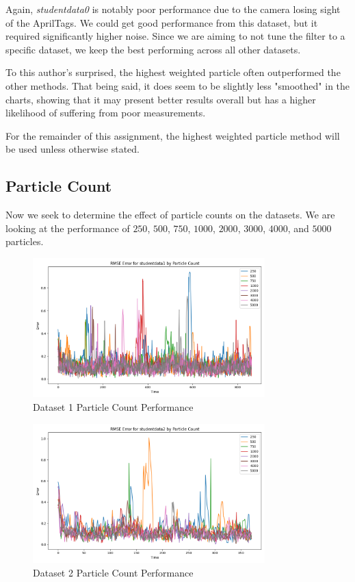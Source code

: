 \documentclass{article}
\begin{document}
Again, \textit{studentdata0} is notably poor performance due to the camera losing sight of the AprilTags. We could get good performance from this dataset, but it required significantly higher noise. Since we are aiming to not tune the filter to a specific dataset, we keep the best performing across all other datasets.

To this author's surprised, the highest weighted particle often outperformed the other methods. That being said, it does seem to be slightly less "smoothed" in the charts, showing that it may present better results overall but has a higher likelihood of suffering from poor measurements.

For the remainder of this assignment, the highest weighted particle method will be used unless otherwise stated.

\subsection*{Particle Count}

Now we seek to determine the effect of particle counts on the datasets. We are looking at the performance of $250$, $500$, $750$, $1000$, $2000$, $3000$, $4000$, and $5000$ particles.

\begin{figure}[H]
    \centering
    \includegraphics[width=0.8\textwidth]{./imgs/task2/studentdata1_rmse_particle_count.png}
    \caption{Dataset 1 Particle Count Performance}
\end{figure}

\begin{figure}[H]
    \centering
    \includegraphics[width=0.8\textwidth]{./imgs/task2/studentdata2_rmse_particle_count.png}
    \caption{Dataset 2 Particle Count Performance}
\end{figure}
\end{document}
